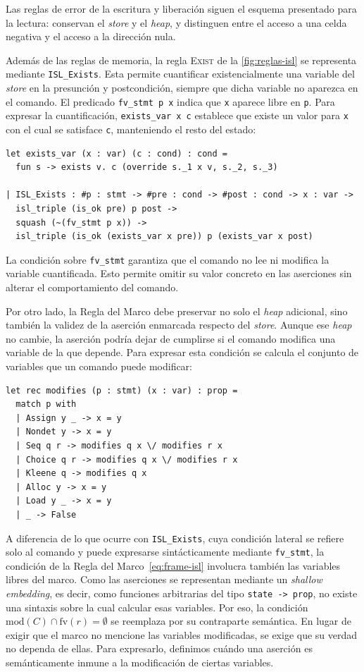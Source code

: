 \documentclass[a4paper,	11pt]{report}
\begin{document}
Las reglas de error de la escritura y liberación siguen el esquema presentado para la lectura:
conservan el \emph{store} y el \emph{heap},
y distinguen entre el acceso a una celda negativa y el acceso a la dirección nula.

Además de las reglas de memoria,
la regla \textsc{Exist} de la \autoref{fig:reglas-isl} se representa mediante \lstinline|ISL_Exists|.
Esta permite cuantificar existencialmente una variable del \emph{store} en la presunción y postcondición,
siempre que dicha variable no aparezca en el comando.
El predicado \lstinline|fv_stmt p x| indica que \lstinline|x| aparece libre en \lstinline|p|.
Para expresar la cuantificación,
\lstinline|exists_var x c| establece que existe un valor para \lstinline|x| con el cual se satisface \lstinline|c|,
manteniendo el resto del estado:

\begin{lstlisting}
let exists_var (x : var) (c : cond) : cond =
  fun s -> exists v. c (override s._1 x v, s._2, s._3)

| ISL_Exists : #p : stmt -> #pre : cond -> #post : cond -> x : var ->
  isl_triple (is_ok pre) p post ->
  squash (~(fv_stmt p x)) ->
  isl_triple (is_ok (exists_var x pre)) p (exists_var x post)
\end{lstlisting}
La condición sobre \lstinline|fv_stmt| garantiza que el comando no lee ni modifica la variable cuantificada.
Esto permite omitir su valor concreto en las aserciones sin alterar el comportamiento del comando.

Por otro lado, la Regla del Marco debe preservar no solo el \emph{heap} adicional,
sino también la validez de la aserción enmarcada respecto del \emph{store}.
Aunque ese \emph{heap} no cambie,
la aserción podría dejar de cumplirse si el comando modifica una variable de la que depende.
Para expresar esta condición se calcula el conjunto de variables que un comando puede modificar:

\begin{lstlisting}
let rec modifies (p : stmt) (x : var) : prop =
  match p with
  | Assign y _ -> x = y
  | Nondet y -> x = y
  | Seq q r -> modifies q x \/ modifies r x
  | Choice q r -> modifies q x \/ modifies r x
  | Kleene q -> modifies q x
  | Alloc y -> x = y
  | Load y _ -> x = y
  | _ -> False
\end{lstlisting}

A diferencia de lo que ocurre con \lstinline|ISL_Exists|,
cuya condición lateral se refiere solo al comando y puede expresarse sintácticamente mediante \lstinline|fv_stmt|,
la condición de la Regla del Marco~\ref{eq:frame-isl} involucra también las variables libres del marco.
Como las aserciones se representan mediante un \emph{shallow embedding},
es decir,
como funciones arbitrarias del tipo \lstinline|state -> prop|,
no existe una sintaxis sobre la cual calcular esas variables.
Por eso,
la condición $\mathrm{mod}(C) \cap \mathrm{fv}(r) = \emptyset$ se reemplaza por su contraparte semántica.
En lugar de exigir que el marco no mencione las variables modificadas,
se exige que su verdad no dependa de ellas.
Para expresarlo,
definimos cuándo una aserción es semánticamente inmune a la modificación de ciertas variables.
\end{document}
